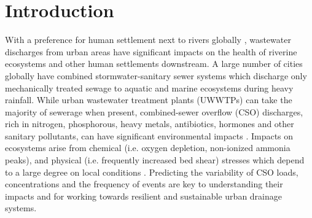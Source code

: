 \documentclass[draft,linenumbers]{agujournal2018}
\begin{document}
%


\begin{abstract}
Water and pollutant f\/luxes from combined sewer overf\/lows (CSO) have a signif\/icant impact on receiving waters. The random nature of rainfall forcing dominates the variability of sewer discharges, pollutant loads, and concentrations. An analytical model developed here, shows how sewer network topology and rainfall properties variously impact the stochasticity of CSO functioning. Probability distributions of sewer discharge and concentration compare well with the results from a calibrated Storm Water Management Model in an application to a sewershed located in Dresden, Germany. The model is determined by only four parameters, three of which can be predicted a priori, two from the rainfall record and one from the network topology using geomorphological f\/low recession theory, while the fourth can be estimated from a short discharge time series.  The sensitivity of CSO and wastewater treatment loads to network structure suggests simple topologies may be more vulnerable to poor performance. The analytical model is useful for evaluating various CSO management strategies to reduce adverse impacts on receiving waters in a probabilistic setting.
\end{abstract}

%
%

\section{Introduction}
With a preference for human settlement next to rivers globally \citep{Fang_2018}, wastewater discharges from urban areas have signif\/icant impacts on the health of riverine ecosystems and other human settlements downstream. A large number of cities globally have combined stormwater-sanitary sewer systems which discharge only mechanically treated sewage to aquatic and marine ecosystems during heavy rainfall. While urban wastewater treatment plants (UWWTPs) can take the majority of sewerage when present, combined-sewer overf\/low (CSO) discharges, rich in nitrogen, phosphorous, heavy metals, antibiotics, hormones and other sanitary pollutants, can have signif\/icant environmental impacts  \citep{Phillips_2012,David_2013}. Impacts on ecosystems arise from chemical (i.e. oxygen depletion, non-ionized ammonia peaks), and physical  (i.e. frequently increased bed shear) stresses which  depend to a large degree on local conditions \citep{borchardt1997urban}. Predicting the variability of CSO loads, concentrations and the frequency of events are key to understanding their impacts and for working towards resilient and sustainable urban drainage systems.
\end{document}
